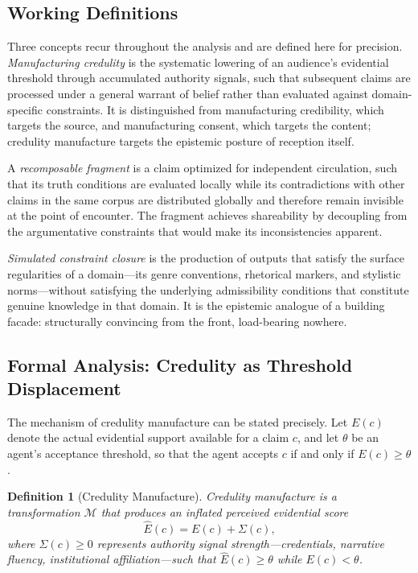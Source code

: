 \documentclass[12pt, a4paper]{article}
\newtheorem{definition}{Definition}[section]
\begin{document}
\subsection{Working Definitions}

Three concepts recur throughout the analysis and are defined here for precision. \textit{Manufacturing
credulity} is the systematic lowering of an audience's evidential threshold through accumulated
authority signals, such that subsequent claims are processed under a general warrant of belief
rather than evaluated against domain-specific constraints. It is distinguished from manufacturing
credibility, which targets the source, and manufacturing consent, which targets the content; credulity
manufacture targets the epistemic posture of reception itself.

A \textit{recomposable fragment} is a claim optimized for independent circulation, such that its
truth conditions are evaluated locally while its contradictions with other claims in the same corpus
are distributed globally and therefore remain invisible at the point of encounter. The fragment
achieves shareability by decoupling from the argumentative constraints that would make its
inconsistencies apparent.

\textit{Simulated constraint closure} is the production of outputs that satisfy the surface
regularities of a domain---its genre conventions, rhetorical markers, and stylistic norms---without
satisfying the underlying admissibility conditions that constitute genuine knowledge in that domain.
It is the epistemic analogue of a building facade: structurally convincing from the front, load-bearing
nowhere.

\subsection{Formal Analysis: Credulity as Threshold Displacement}

The mechanism of credulity manufacture can be stated precisely. Let $E(c)$ denote the actual
evidential support available for a claim $c$, and let $\theta$ be an agent's acceptance threshold,
so that the agent accepts $c$ if and only if $E(c) \ge \theta$.

\begin{definition}[Credulity Manufacture]
Credulity manufacture is a transformation $\mathcal{M}$ that produces an inflated perceived
evidential score
\[
\hat{E}(c) = E(c) + \Sigma(c),
\]
where $\Sigma(c) \ge 0$ represents authority signal strength---credentials, narrative fluency,
institutional affiliation---such that $\hat{E}(c) \ge \theta$ while $E(c) < \theta$.
\end{definition}
\end{document}
